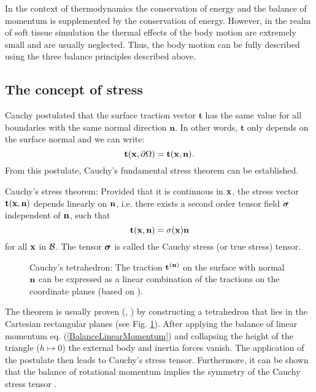 In the context of thermodynamics the conservation of energy and the balance of momentum is supplemented by the conservation of energy. However, in the realm of soft tissue simulation the thermal effects of the body motion are extremely small and are usually neglected. Thus, the body motion can be fully described using the three balance principles described above.



\subsection{The concept of stress}
Cauchy postulated that the surface traction vector $\mathbf t$ has the same value for all boundaries with the same normal direction $\mathbf n$. In other words, $\mathbf t$ only depends on the surface normal and we can write:
 \begin{equation}
\mathbf {t}  (\mathbf {x} , \partial \Omega) = \mathbf {t}  (\mathbf {x} , \mathbf {n} ).
\end{equation}
From this postulate, Cauchy's fundamental stress theorem can be established.
\begin{theorem}
Cauchy's stress theorem: Provided that it is continuous in $\mathbf {x} $, the stress vector $\mathbf {t} (\mathbf {x} , \mathbf {n} )$ depends linearly on $\mathbf {n} $, i.e. there exists a second order tensor field $\boldsymbol{\sigma}$ independent of $\mathbf {n} $, such that
\begin{equation}
\mathbf {t}  (\mathbf {x} , \mathbf {n} ) = \sigma (\mathbf {x} )  \mathbf {n} 
\label{CauchyTheoremEquation}
\end{equation}
for all $\mathbf {x} $ in $\mathcal{B} $. The tensor $\boldsymbol{\sigma}$ is called the Cauchy stress (or true stress) tensor.
\end{theorem}

\begin{figure}
   \centering   
	\caption{Cauchy's tetrahedron: The traction $\mathbf {t} ^{(\mathbf {n} )}$ on the surface with normal $\mathbf {n} $ can be expressed as a linear combination of the tractions on the coordinate planes (based on \cite{Wikipedi2013}).}
\label{CauchyTetrahedron}
\end{figure}

The theorem is usually proven (\cite{Ogden1997}, \cite{Bonet1997}) by constructing a tetrahedron that lies in the Cartesian rectangular planes (see Fig. \ref{CauchyTetrahedron}). After applying the balance of linear momentum eq. (\ref{BalanceLinearMomentum}) and collapsing the height of the triangle ($h \mapsto 0$) the external body and inertia forces vanish. The application of the postulate then leads to Cauchy's stress tensor. Furthermore, it can be shown that the balance of rotational momentum implies the symmetry of the Cauchy stress tensor \cite{Holzapfel2001}.

